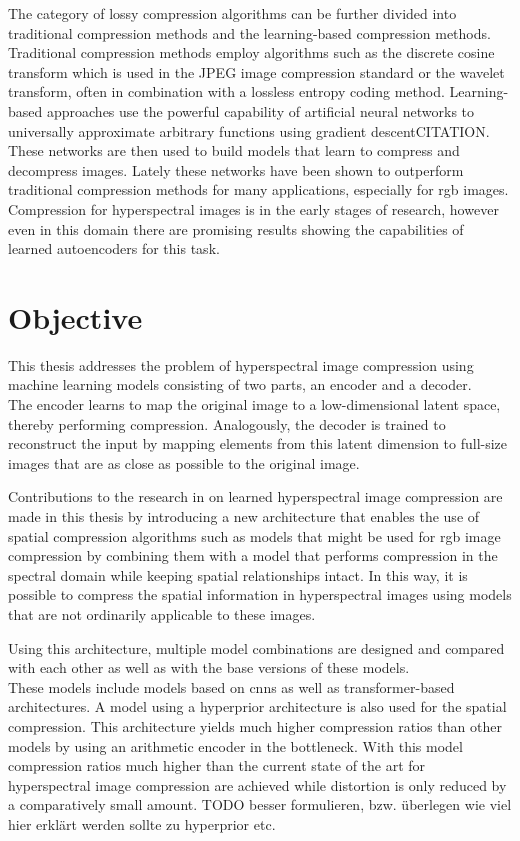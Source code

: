The category of lossy compression algorithms can be further divided into traditional compression methods and the learning-based compression methods. Traditional compression methods employ algorithms such as the discrete cosine transform which is used in the JPEG image compression standard or the wavelet transform, often in combination with a lossless entropy coding method. Learning-based approaches use the powerful capability of artificial neural networks to universally approximate arbitrary functions using gradient descentCITATION. These networks are then used to build models that learn to compress and decompress images. Lately these networks have been shown to outperform traditional compression methods for many applications, especially for \ac{rgb} images.
Compression for hyperspectral images is in the early stages of research, however even in this domain there are promising results showing the capabilities of learned autoencoders for this task.

\section{Objective\label{sec:objective}}
This thesis addresses the problem of hyperspectral image compression using machine learning models consisting of two parts, an encoder and a decoder.\\
The encoder learns to map the original image to a low-dimensional latent space, thereby performing compression. Analogously, the decoder is trained to reconstruct the input by mapping elements from this latent dimension to full-size images that are as close as possible to the original image.

Contributions to the research in on learned hyperspectral image compression are made in this thesis by introducing a new architecture that enables the use of spatial compression algorithms such as models that might be used for \ac{rgb} image compression by combining them with a model that performs compression in the spectral domain while keeping spatial relationships intact. In this way, it is possible to compress the spatial information in hyperspectral images using models that are not ordinarily applicable to these images.

Using this architecture, multiple model combinations are designed and compared with each other as well as with the base versions of these models.\\
These models include models based on \acp{cnn} as well as transformer-based architectures.
A model using a hyperprior architecture is also used for the spatial compression. This architecture yields much higher compression ratios than other models by using an arithmetic encoder in the bottleneck. With this model compression ratios much higher than the current state of the art for hyperspectral image compression are achieved while distortion is only reduced by a comparatively small amount. TODO besser formulieren, bzw. überlegen wie viel hier erklärt werden sollte zu hyperprior etc.

